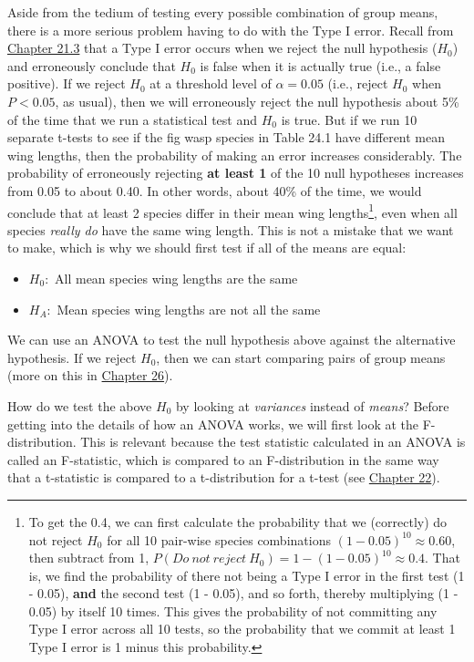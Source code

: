\documentclass[
  openany]{krantz}
\providecommand{\tightlist}{%
  \setlength{\itemsep}{0pt}\setlength{\parskip}{0pt}}
\begin{document}
Aside from the tedium of testing every possible combination of group means, there is a more serious problem having to do with the Type I error.
Recall from \protect\hyperlink{p-values-false-positives-and-power}{Chapter 21.3} that a Type I error occurs when we reject the null hypothesis (\(H_{0}\)) and erroneously conclude that \(H_{0}\) is false when it is actually true (i.e., a false positive).
If we reject \(H_{0}\) at a threshold level of \(\alpha = 0.05\) (i.e., reject \(H_{0}\) when \(P < 0.05\), as usual), then we will erroneously reject the null hypothesis about 5\% of the time that we run a statistical test and \(H_{0}\) is true.
But if we run 10 separate t-tests to see if the fig wasp species in Table 24.1 have different mean wing lengths, then the probability of making an error increases considerably.
The probability of erroneously rejecting \textbf{at least 1} of the 10 null hypotheses increases from 0.05 to about 0.40.
In other words, about 40\% of the time, we would conclude that at least 2 species differ in their mean wing lengths\footnote{To get the 0.4, we can first calculate the probability that we (correctly) do not reject \(H_{0}\) for all 10 pair-wise species combinations \((1 - 0.05)^{10} \approx 0.60\), then subtract from 1, \(P(Do\:not\:reject\:H_{0}) = 1 - (1 - 0.05)^{10} \approx 0.4\). That is, we find the probability of there not being a Type I error in the first test (1 - 0.05), \textbf{and} the second test (1 - 0.05), and so forth, thereby multiplying (1 - 0.05) by itself 10 times. This gives the probability of not committing any Type I error across all 10 tests, so the probability that we commit at least 1 Type I error is 1 minus this probability.}, even when all species \emph{really do} have the same wing length.
This is not a mistake that we want to make, which is why we should first test if all of the means are equal:

\begin{itemize}
\tightlist
\item
  \(H_{0}:\) All mean species wing lengths are the same
\item
  \(H_{A}:\) Mean species wing lengths are not all the same
\end{itemize}

We can use an ANOVA to test the null hypothesis above against the alternative hypothesis.
If we reject \(H_{0}\), then we can start comparing pairs of group means (more on this in \protect\hyperlink{Chapter_26}{Chapter 26}).

How do we test the above \(H_{0}\) by looking at \emph{variances} instead of \emph{means}?
Before getting into the details of how an ANOVA works, we will first look at the F-distribution.
This is relevant because the test statistic calculated in an ANOVA is called an F-statistic, which is compared to an F-distribution in the same way that a t-statistic is compared to a t-distribution for a t-test (see \protect\hyperlink{Chapter_22}{Chapter 22}).
\end{document}
